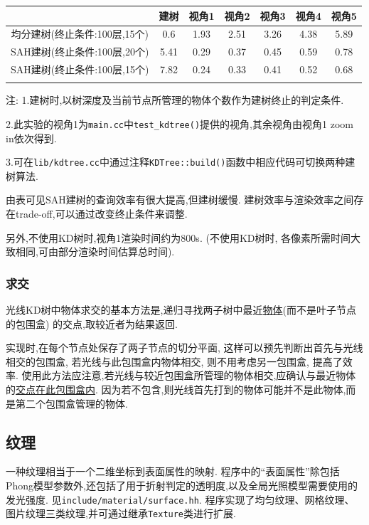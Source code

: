 \begin{table}[H]
  \begin{threeparttable}
    \begin{tabular}{c|c|c|c|c|c|c}
      \shline
      & 建树 & 视角1 & 视角2 & 视角3 & 视角4 & 视角5 \\ \hline
      均分建树(终止条件:100层,15个)  & 0.6  & 1.93  & 2.51  & 3.26  & 4.38  & 5.89  \\ \hline
      SAH建树(终止条件:100层,20个) & 5.41 & 0.29  & 0.37  & 0.45  & 0.59  & 0.78    \\ \hline
      SAH建树(终止条件:100层,15个) & 7.82 & 0.24  & 0.33  & 0.41  & 0.52  & 0.68    \\ \shline
    \end{tabular}
    \begin{tablenotes}
      \footnotesize
    \item 注: 1.建树时,以树深度及当前节点所管理的物体个数作为建树终止的判定条件.
    \item 2.此实验的视角1为\verb|main.cc|中\verb|test_kdtree()|提供的视角,其余视角由视角1 zoom in依次得到.
    \item 3.可在\verb|lib/kdtree.cc|中通过注释\verb|KDTree::build()|函数中相应代码可切换两种建树算法.
    \end{tablenotes}
  \end{threeparttable}
\end{table}

由表可见SAH建树的查询效率有很大提高,但建树缓慢.
建树效率与渲染效率之间存在trade-off,可以通过改变终止条件来调整.

另外,不使用KD树时,视角1渲染时间约为800s.
(不使用KD树时, 各像素所需时间大致相同,可由部分渲染时间估算总时间).

\subsubsection{求交}
光线KD树中物体求交的基本方法是,递归寻找两子树中最近\underline{物体}(而不是叶子节点的包围盒)
的交点,取较近者为结果返回.

实现时,在每个节点处保存了两子节点的切分平面,
这样可以预先判断出首先与光线相交的包围盒,
若光线与此包围盒内物体相交, 则不用考虑另一包围盒, 提高了效率.
使用此方法应注意,若光线与较近包围盒所管理的物体相交,应确认与最近物体的\underline{交点在此包围盒内}.
因为若不包含,则光线首先打到的物体可能并不是此物体,而是第二个包围盒管理的物体.

\subsection{纹理}
一种纹理相当于一个二维坐标到表面属性的映射.
程序中的``表面属性''除包括Phong模型参数外,还包括了用于折射判定的透明度,以及全局光照模型需要使用的发光强度.
见\verb|include/material/surface.hh|.
程序实现了均匀纹理、网格纹理、图片纹理三类纹理,并可通过继承\verb|Texture|类进行扩展.


